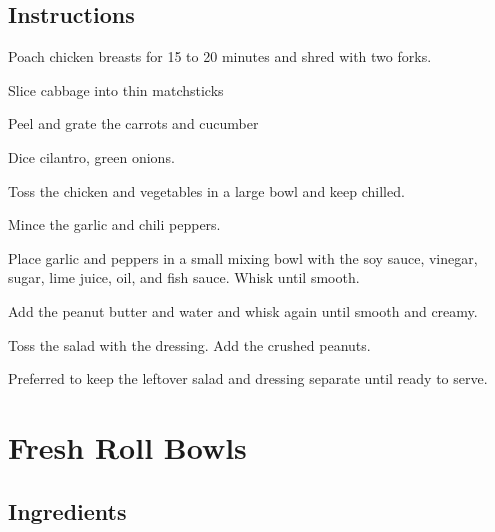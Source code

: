 \documentclass[letterpaper,10pt,english]{sphinxmanual}
\begin{document}
\section{Instructions}
\label{\detokenize{Chopped_Thai_Cluck_Salad:instructions}}

Poach chicken breasts for 15 to 20 minutes and shred with two forks.

Slice cabbage into thin matchsticks

Peel and grate the carrots and cucumber

Dice cilantro, green onions.

Toss the chicken and vegetables in a large bowl and keep chilled.


Mince the garlic and chili peppers.

Place garlic and peppers in a small mixing bowl with the soy sauce, vinegar, sugar, lime juice, oil, and fish sauce. Whisk until smooth.

Add the peanut butter and water and whisk again until smooth and creamy.


Toss the salad with the dressing. Add the crushed peanuts.

Preferred to keep the leftover salad and dressing separate until ready to serve.


\chapter{Fresh Roll Bowls}
\label{\detokenize{FRB:fresh-roll-bowls}}\label{\detokenize{FRB::doc}}

\section{Ingredients}
\label{\detokenize{FRB:ingredients}}

%
\begin{sphinxVerbatim}[commandchars=\\\{\}]
       

    

     

     

   

     

    

   
\end{sphinxVerbatim}
\end{document}
